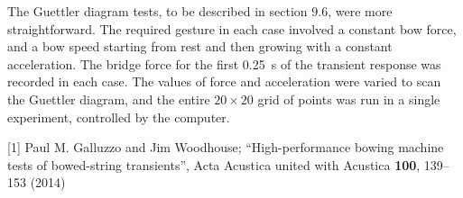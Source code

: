  The Guettler diagram tests, to be described in section 9.6, were more 
  straightforward. The required gesture in each case involved a constant bow 
  force, and a bow speed starting from rest and then growing with a constant 
  acceleration. The bridge force for the first 0.25 s of the transient response 
  was recorded in each case. The values of force and acceleration were varied 
  to scan the Guettler diagram, and the entire $20 \times 20$ grid of points 
  was run in a single experiment, controlled by the computer. 

  \sectionreferences{}[1] Paul M. Galluzzo and Jim Woodhouse; 
  ``High-performance bowing machine tests of bowed-string transients'', Acta 
  Acustica united with Acustica \textbf{100}, 139--153 (2014) 
